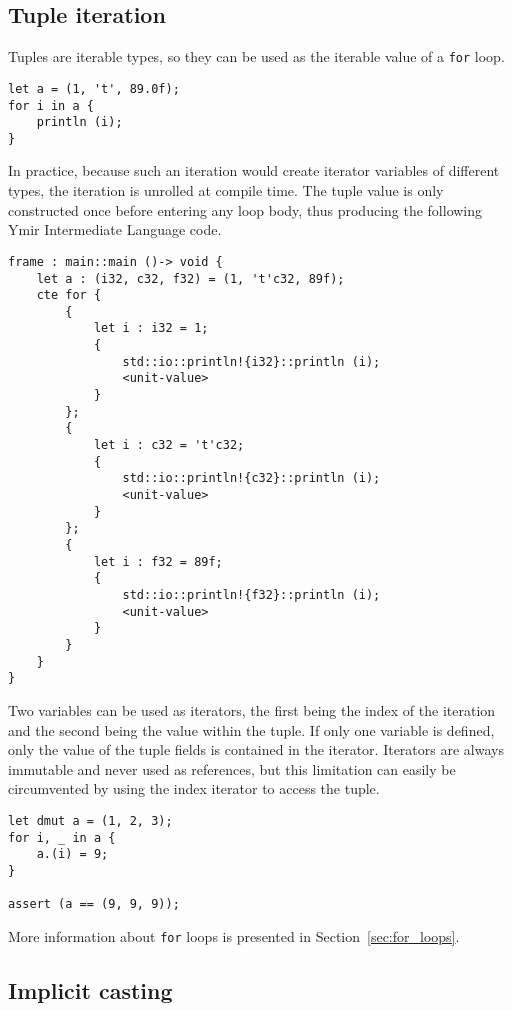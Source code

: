 \subsection {Tuple iteration}

Tuples are iterable types, so they can be used as the iterable value of a
\texttt{for} loop.

\begin{lstlisting}[style=coloredverbatim]
let a = (1, 't', 89.0f);
for i in a {
    println (i);
}
\end{lstlisting}

In practice, because such an iteration would create iterator variables of
different types, the iteration is unrolled at compile time. The tuple value is
only constructed once before entering any loop body, thus producing the
following Ymir Intermediate Language code.

\begin{lstlisting}[style=intermediateVerb]
frame : main::main ()-> void {
    let a : (i32, c32, f32) = (1, 't'c32, 89f);
    cte for {
        {
            let i : i32 = 1;
            {
                std::io::println!{i32}::println (i);
                <unit-value>
            }
        };
        {
            let i : c32 = 't'c32;
            {
                std::io::println!{c32}::println (i);
                <unit-value>
            }
        };
        {
            let i : f32 = 89f;
            {
                std::io::println!{f32}::println (i);
                <unit-value>
            }
        }
    }
}
\end{lstlisting}

Two variables can be used as iterators, the first being the index of the
iteration and the second being the value within the tuple. If only one variable
is defined, only the value of the tuple fields is contained in the iterator.
Iterators are always immutable and never used as references, but this limitation
can easily be circumvented by using the index iterator to access the tuple.
\pagebreak

\begin{lstlisting}[style=coloredverbatim]
let dmut a = (1, 2, 3);
for i, _ in a {
    a.(i) = 9;
}

assert (a == (9, 9, 9));
\end{lstlisting}

More information about \texttt{for} loops is presented in Section~\ref{sec:for_loops}.


\subsection {Implicit casting}

